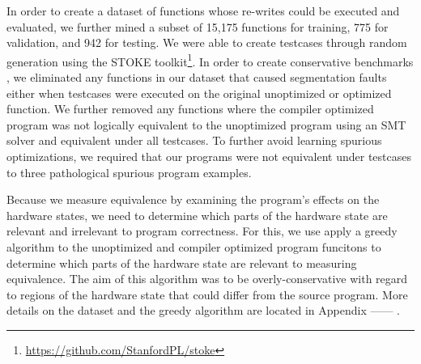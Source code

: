 \documentclass{article}
\begin{document}
In order to create a dataset of functions whose re-writes could be executed and evaluated, we further mined a subset of 15,175 functions for training, 775 for validation, and 942 for testing.   We were able to create testcases through random generation using the \textsc{STOKE} toolkit\footnote{\url{https://github.com/StanfordPL/stoke}}.   In order to create conservative benchmarks , we eliminated any functions in our dataset that caused segmentation faults either when testcases were executed on the original unoptimized or optimized function.  We further removed any functions where the compiler optimized program was not logically equivalent to the unoptimized program using an SMT solver and equivalent under all testcases.  To further avoid learning spurious optimizations, we required that our programs were not equivalent under testcases to three pathological spurious program examples. 


Because we measure equivalence by examining the program's effects on the hardware states, we need to determine which parts of the hardware state are relevant and irrelevant to program correctness.   For this, we use apply a greedy algorithm to the unoptimized and compiler optimized program funcitons to determine which parts of the hardware state are relevant to measuring equivalence. The aim of this algorithm was to be overly-conservative with regard to regions of the hardware state that could differ from the source program. More details on the dataset and the greedy algorithm are located in Appendix ------ .
\end{document}
